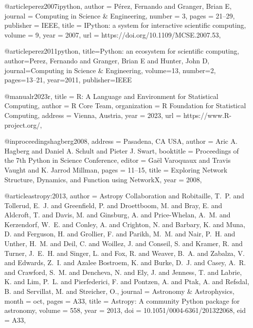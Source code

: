 @article{perez2007ipython,
  author =        {P{\'e}rez, Fernando and Granger, Brian E},
  journal =       {Computing in Science \& Engineering},
  number =        {3},
  pages =         {21--29},
  publisher =     {IEEE},
  title =         {{IP}ython: a system for interactive scientific
                   computing},
  volume =        {9},
  year =          {2007},
  url =           {https://doi.org/10.1109/MCSE.2007.53},
}

@article{perez2011python,
  title={Python: an ecosystem for scientific computing},
  author={Perez, Fernando and Granger, Brian E and Hunter, John D},
  journal={Computing in Science \& Engineering},
  volume={13},
  number={2},
  pages={13--21},
  year={2011},
  publisher={IEEE}
}

@manual{r2023r,
  title = {R: A Language and Environment for Statistical Computing},
  author = {{R Core Team}},
  organization = {R Foundation for Statistical Computing},
  address = {Vienna, Austria},
  year = {2023},
  url = {https://www.R-project.org/},
}

@inproceedings{hagberg2008,
  address =       {Pasadena, CA USA},
  author =        {Aric A. Hagberg and Daniel A. Schult and
                   Pieter J. Swart},
  booktitle =     {Proceedings of the 7th Python in Science Conference},
  editor =        {Ga\"el Varoquaux and Travis Vaught and
                   K. Jarrod Millman},
  pages =         {11--15},
  title =         {Exploring Network Structure, Dynamics, and Function
                   using {NetworkX}},
  year =          {2008},
}

@article{astropy:2013,
  author =        {{Astropy Collaboration} and {Robitaille}, T.~P. and
                   {Tollerud}, E.~J. and {Greenfield}, P. and
                   {Droettboom}, M. and {Bray}, E. and {Aldcroft}, T. and
                   {Davis}, M. and {Ginsburg}, A. and
                   {Price-Whelan}, A.~M. and {Kerzendorf}, W.~E. and
                   {Conley}, A. and {Crighton}, N. and {Barbary}, K. and
                   {Muna}, D. and {Ferguson}, H. and {Grollier}, F. and
                   {Parikh}, M.~M. and {Nair}, P.~H. and {Unther}, H.~M. and
                   {Deil}, C. and {Woillez}, J. and {Conseil}, S. and
                   {Kramer}, R. and {Turner}, J.~E.~H. and {Singer}, L. and
                   {Fox}, R. and {Weaver}, B.~A. and {Zabalza}, V. and
                   {Edwards}, Z.~I. and {Azalee Bostroem}, K. and
                   {Burke}, D.~J. and {Casey}, A.~R. and
                   {Crawford}, S.~M. and {Dencheva}, N. and {Ely}, J. and
                   {Jenness}, T. and {Labrie}, K. and {Lim}, P.~L. and
                   {Pierfederici}, F. and {Pontzen}, A. and {Ptak}, A. and
                   {Refsdal}, B. and {Servillat}, M. and
                   {Streicher}, O.},
  journal =       {Astronomy \& Astrophysics},
  month =         oct,
  pages =         {A33},
  title =         {{Astropy: A community Python package for astronomy}},
  volume =        {558},
  year =          {2013},
  doi =           {10.1051/0004-6361/201322068},
  eid =           {A33},
}


